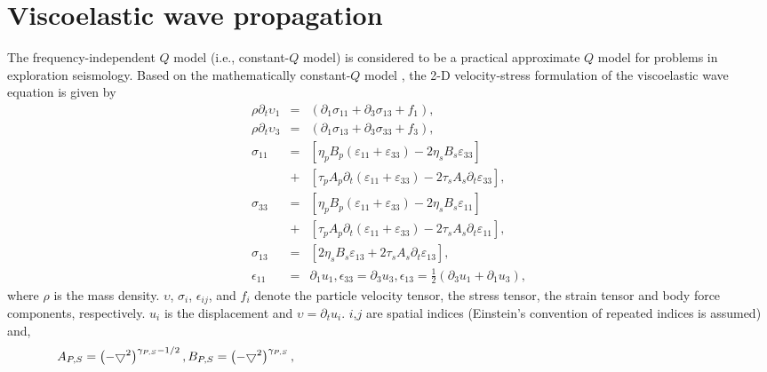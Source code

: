 \section{Viscoelastic wave propagation}
The frequency-independent $Q$ model (i.e., constant-$Q$ model) is considered to be a practical approximate $Q$ model for problems in exploration seismology. Based on the mathematically constant-$Q$ model \cite[]{kja79}, the 2-D velocity-stress formulation of the viscoelastic wave equation is given by \cite[]{zhu14c}
\begin{eqnarray}                  
\rho \partial _t\upsilon _1 &=& \left (  \partial _1 \sigma_{11}+\partial _3 \sigma_{13}+f_1\right ),\label{eq:eq1}\\                   
\rho \partial _t\upsilon _3 &=& \left (  \partial _1 \sigma_{13}+\partial_3 \sigma_{33}+f_3\right ),\label{eq:eq2}\\                  
\sigma _{11} &=& \left [ \eta _pB_p(\varepsilon_{11}+\varepsilon_{33} )-2\eta _sB_s\varepsilon_{33}  \right ] \nonumber \\
&+& \left [ \tau _pA_p\partial _t (\varepsilon_{11}+\varepsilon_{33} )-2\tau _sA_s\partial _t \varepsilon_{33} \right ],\label{eq:eq3} \\
\sigma _{33} &=& \left [ \eta _pB_p(\varepsilon_{11}+\varepsilon_{33} )-2\eta _sB_s\varepsilon_{11}  \right ] \nonumber \\
&+& \left [ \tau _pA_p\partial _t (\varepsilon_{11}+\varepsilon_{33} )-2\tau _sA_s\partial _t \varepsilon_{11} \right ],\label{eq:eq4}\\        
\sigma _{13} &=& \left [ 2\eta _sB_s\varepsilon_{13}+2\tau _sA_s\partial _t \varepsilon_{13} \right ],\label{eq:eq5}\\              
\epsilon _{11} &=& \partial _1 u_1,\epsilon _{33}=\partial _3 u_3,\epsilon _{13}=\frac{1}{2}\left ( \partial _3 u_1+\partial _1 u_3 \right ), \label{eq:eq6}
\end{eqnarray}
where $\rho$ is the mass density. $\upsilon$, $\sigma_i$, $\epsilon_{ij}$, and $f_i$ denote the particle velocity tensor, the stress tensor, the strain tensor and body force components, respectively. $u_i$ is the displacement and $\upsilon=\partial_tu_i$. $i$,$j$ are spatial indices (Einstein’s convention of repeated indices is assumed) and,
\begin{equation}
\label{eq:eq7}                      
\hspace{0pt} A_{P,S}=\left ( -\bigtriangledown^2  \right )^{\gamma _{P,S}-1/2},B_{P,S}=\left ( -\bigtriangledown^2  \right )^{\gamma _{P,S}},\hspace{\linewidth minus\linewidth}
\end{equation}
